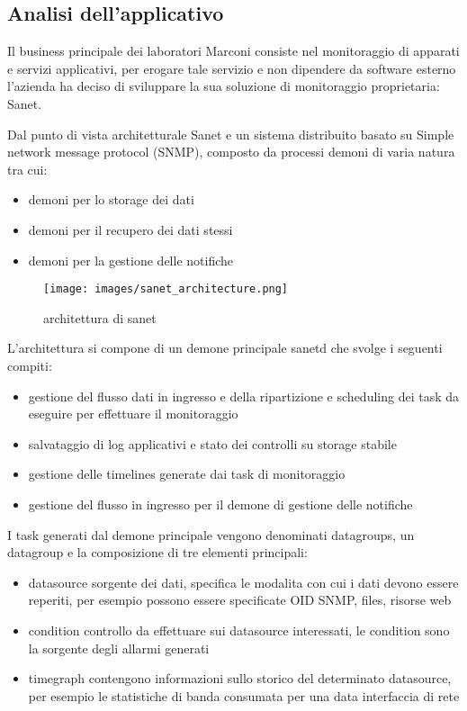 \documentclass[12pt,a4paper,twoside,openright]{book}
\begin{document}
\subsection{Analisi dell'applicativo}

Il business principale dei laboratori Marconi consiste nel monitoraggio di apparati e servizi applicativi, per erogare tale servizio e non dipendere da software esterno l'azienda ha deciso di sviluppare la sua soluzione di monitoraggio proprietaria: Sanet.

Dal punto di vista architetturale Sanet e un sistema distribuito basato su Simple network message protocol (SNMP), composto da processi demoni di varia natura tra cui:

\begin{itemize}
    \item demoni per lo storage dei dati
    \item demoni per il recupero dei dati stessi
    \item demoni per la gestione delle notifiche
\end{itemize}

\begin{figure}[H]
    \centering
    \texttt{[image: images/sanet\_architecture.png]}
    \caption{architettura di sanet}
    \label{fig:enter-label}
\end{figure}

L'architettura si compone di un demone principale sanetd che svolge i seguenti compiti:

\begin{itemize}
  \item gestione del flusso dati in ingresso e della ripartizione e scheduling dei task da eseguire per effettuare il monitoraggio
  \item salvataggio di log applicativi e stato dei controlli su storage stabile
  \item gestione delle timelines generate dai task di monitoraggio
  \item gestione del flusso in ingresso per il demone di gestione delle notifiche
\end{itemize}

I task generati dal demone principale vengono denominati datagroups, un datagroup e la composizione di tre elementi principali:

\begin{itemize}
  \item datasource sorgente dei dati, specifica le modalita con cui i dati devono essere reperiti, per esempio possono essere specificate OID SNMP, files, risorse web
  \item condition controllo da effettuare sui datasource interessati, le condition sono la sorgente degli allarmi generati
  \item timegraph contengono informazioni sullo storico del determinato datasource, per esempio le statistiche di banda consumata per una data interfaccia di rete
\end{itemize}
\end{document}

